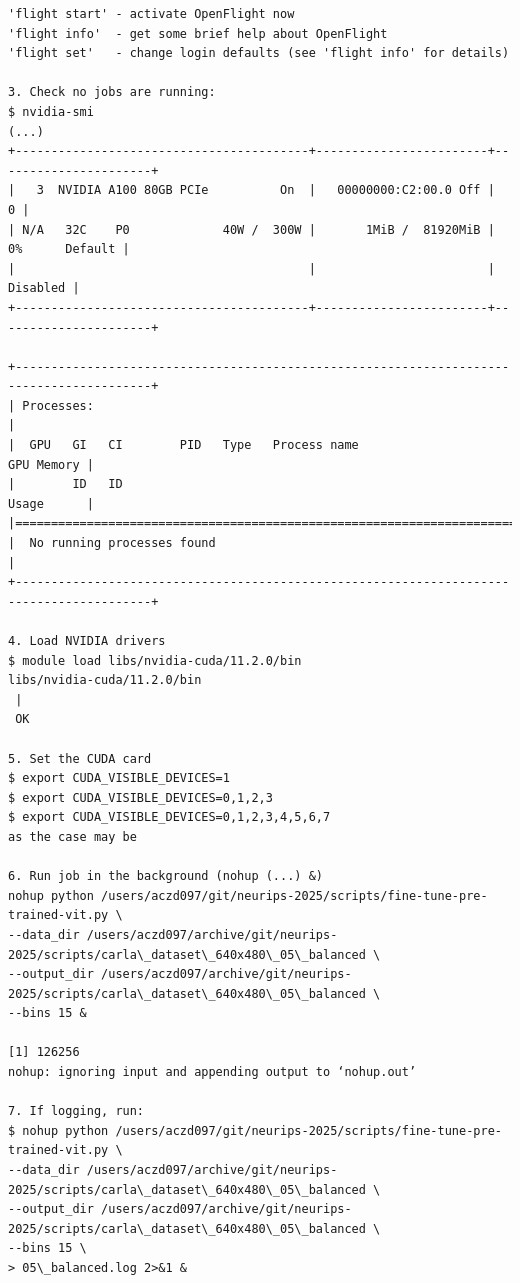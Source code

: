 \begin{verbatim}
'flight start' - activate OpenFlight now
'flight info'  - get some brief help about OpenFlight
'flight set'   - change login defaults (see 'flight info' for details)

3. Check no jobs are running:
$ nvidia-smi
(...)
+-----------------------------------------+------------------------+----------------------+
|   3  NVIDIA A100 80GB PCIe          On  |   00000000:C2:00.0 Off |                    0 |
| N/A   32C    P0             40W /  300W |       1MiB /  81920MiB |      0%      Default |
|                                         |                        |             Disabled |
+-----------------------------------------+------------------------+----------------------+
                                                                                         
+-----------------------------------------------------------------------------------------+
| Processes:                                                                              |
|  GPU   GI   CI        PID   Type   Process name                              GPU Memory |
|        ID   ID                                                               Usage      |
|=========================================================================================|
|  No running processes found                                                             |
+-----------------------------------------------------------------------------------------+

4. Load NVIDIA drivers
$ module load libs/nvidia-cuda/11.2.0/bin
libs/nvidia-cuda/11.2.0/bin
 |
 OK

5. Set the CUDA card
$ export CUDA_VISIBLE_DEVICES=1
$ export CUDA_VISIBLE_DEVICES=0,1,2,3
$ export CUDA_VISIBLE_DEVICES=0,1,2,3,4,5,6,7
as the case may be

6. Run job in the background (nohup (...) &)
nohup python /users/aczd097/git/neurips-2025/scripts/fine-tune-pre-trained-vit.py \
--data_dir /users/aczd097/archive/git/neurips-2025/scripts/carla\_dataset\_640x480\_05\_balanced \
--output_dir /users/aczd097/archive/git/neurips-2025/scripts/carla\_dataset\_640x480\_05\_balanced \
--bins 15 &

[1] 126256
nohup: ignoring input and appending output to ‘nohup.out’

7. If logging, run:
$ nohup python /users/aczd097/git/neurips-2025/scripts/fine-tune-pre-trained-vit.py \
--data_dir /users/aczd097/archive/git/neurips-2025/scripts/carla\_dataset\_640x480\_05\_balanced \
--output_dir /users/aczd097/archive/git/neurips-2025/scripts/carla\_dataset\_640x480\_05\_balanced \
--bins 15 \
> 05\_balanced.log 2>&1 &


\end{verbatim}
